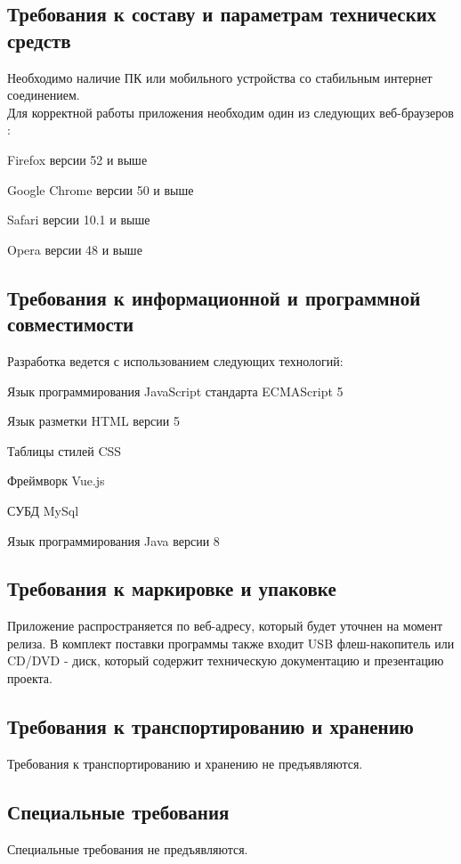 \subsection{Требования к составу и параметрам технических средств}
Необходимо наличие ПК или мобильного устройства со стабильным интернет соединением.\\
Для корректной работы приложения необходим один из следующих веб-браузеров \cite{css_grid}:
\begin{my_enumerate}
  \item Firefox версии 52 и выше
  \item Google Chrome версии 50 и выше
  \item Safari версии 10.1 и выше
  \item Opera версии 48 и выше
\end{my_enumerate}


\subsection{Требования к информационной и программной совместимости}
Разработка ведется с использованием следующих технологий:
\begin{my_enumerate}
  \item Язык программирования JavaScript стандарта ECMAScript 5
  \item Язык разметки HTML версии 5
  \item Таблицы стилей CSS
  \item Фреймворк Vue.js
  \item СУБД MySql
  \item Язык программирования Java версии 8
\end{my_enumerate}


\subsection{Требования к маркировке и упаковке}
Приложение распространяется по веб-адресу, который будет уточнен на момент релиза.
В комплект поставки программы также входит USB флеш-накопитель или CD/DVD - диск,
который содержит техническую документацию и презентацию проекта. 


\subsection{Требования к транспортированию и хранению}
Требования к транспортированию и хранению не предъявляются.


\subsection{Специальные требования}
Специальные требования не предъявляются.

